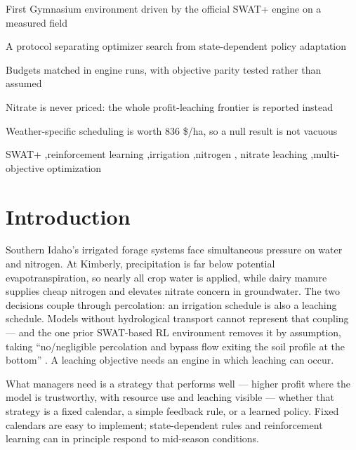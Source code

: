 \documentclass[a4paper,fleqn]{cas-sc}
\begin{document}
\begin{highlights}
\item First Gymnasium environment driven by the official SWAT+ engine on a measured field
\item A protocol separating optimizer search from state-dependent policy adaptation
\item Budgets matched in engine runs, with objective parity tested rather than assumed
\item Nitrate is never priced: the whole profit-leaching frontier is reported instead
\item Weather-specific scheduling is worth 836 \$/ha, so a null result is not vacuous
\end{highlights}

\begin{keywords}
SWAT+ \sep reinforcement learning \sep irrigation \sep nitrogen \sep
nitrate leaching \sep multi-objective optimization
\end{keywords}

\maketitle

\section{Introduction}\label{sec:intro}

Southern Idaho's irrigated forage systems face simultaneous pressure on water and
nitrogen. At Kimberly, precipitation is far below potential evapotranspiration, so
nearly all crop water is applied, while dairy manure supplies cheap nitrogen and
elevates nitrate concern in groundwater. The two decisions couple through percolation:
an irrigation schedule is also a leaching schedule. Models without hydrological
transport cannot represent that coupling --- and the one prior SWAT-based RL
environment removes it by assumption, taking ``no/negligible percolation and bypass
flow exiting the soil profile at the bottom'' \citep{madondo2023}. A leaching objective
needs an engine in which leaching can occur.

What managers need is a strategy that performs well --- higher profit where the model
is trustworthy, with resource use and leaching visible --- whether that strategy is a
fixed calendar, a simple feedback rule, or a learned policy. Fixed calendars are easy
to implement; state-dependent rules and reinforcement learning can in principle respond
to mid-season conditions.
\end{document}
